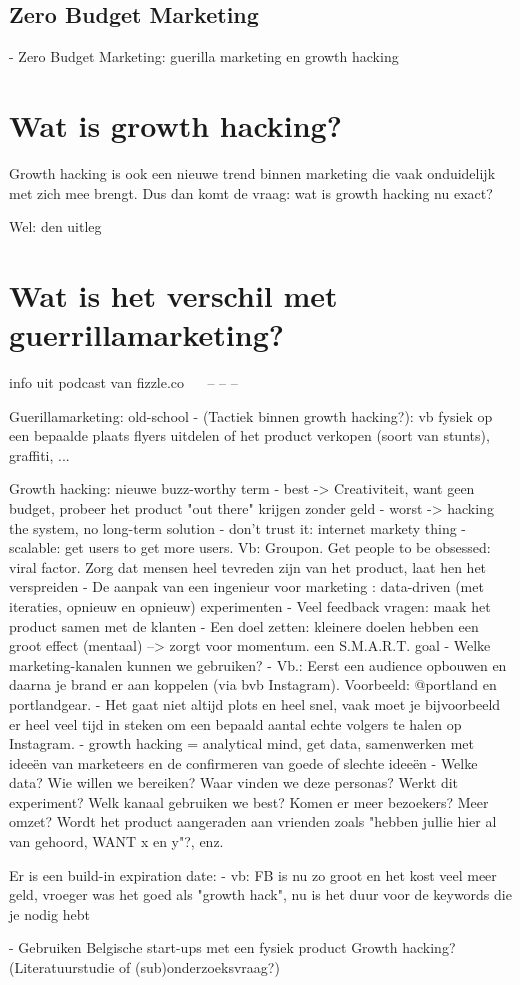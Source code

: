 \subsection{Zero Budget Marketing}
\label{sec:zero-budget-marketing}
- Zero Budget Marketing: guerilla marketing en growth hacking

\section{Wat is growth hacking?}
\label{sec:wat-is-growth-hacking}
Growth hacking is ook een nieuwe trend binnen marketing die vaak onduidelijk met zich mee brengt. Dus dan komt de vraag: wat is growth hacking nu exact?

Wel: den uitleg

\section{Wat is het verschil met guerrillamarketing?}
\label{sec:verschil-met-guerrillamarketing}

info uit podcast van fizzle.co
~~\autocite{fizzle.co2015}
 -- -- -- 

Guerillamarketing: old-school
- (Tactiek binnen growth hacking?): vb fysiek op een bepaalde plaats flyers uitdelen of het product verkopen (soort van stunts), graffiti, ...

Growth hacking: nieuwe buzz-worthy term
- best -> Creativiteit, want geen budget, probeer het product "out there" krijgen zonder geld
- worst -> hacking the system, no long-term solution
- don't trust it: internet markety thing
- scalable: get users to get more users. Vb: Groupon. Get people to be obsessed: viral factor. Zorg dat mensen heel tevreden zijn van het product, laat hen het verspreiden
- De aanpak van een ingenieur voor marketing : data-driven (met iteraties, opnieuw en opnieuw) experimenten
- Veel feedback vragen: maak het product samen met de klanten
- Een doel zetten: kleinere doelen hebben een groot effect (mentaal) --> zorgt voor momentum. een S.M.A.R.T. goal
- Welke marketing-kanalen kunnen we gebruiken?
- Vb.: Eerst een audience opbouwen en daarna je brand er aan koppelen (via bvb Instagram). Voorbeeld: @portland en portlandgear.
- Het gaat niet altijd plots en heel snel, vaak moet je bijvoorbeeld er heel veel tijd in steken om een bepaald aantal echte volgers te halen op Instagram. 
- growth hacking = analytical mind, get data, samenwerken met ideeën van marketeers en de confirmeren van goede of slechte ideeën
- Welke data? Wie willen we bereiken? Waar vinden we deze personas? Werkt dit experiment? Welk kanaal gebruiken we best? Komen er meer bezoekers? Meer omzet? Wordt het product aangeraden aan vrienden zoals "hebben jullie hier al van gehoord, WANT x en y"?, enz.


Er is een build-in expiration date:
- vb: FB is nu zo groot en het kost veel meer geld, vroeger was het goed als "growth hack", nu is het duur voor de keywords die je nodig hebt



- Gebruiken Belgische start-ups met een fysiek product Growth hacking? (Literatuurstudie of (sub)onderzoeksvraag?)
